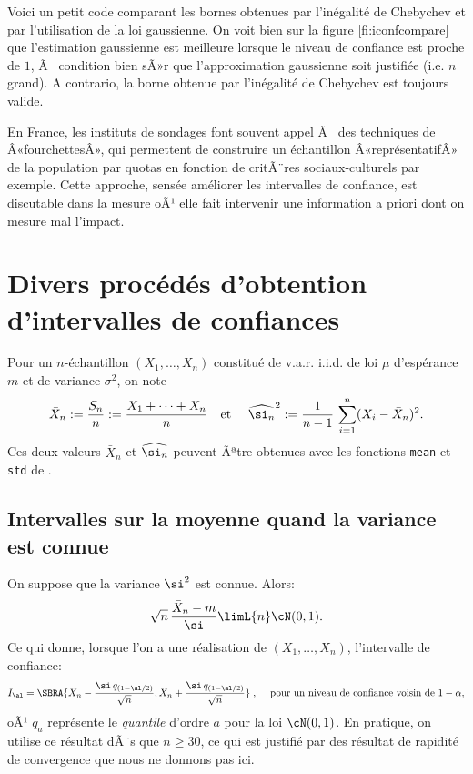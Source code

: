 Voici un petit code \ML{} comparant les bornes obtenues par l'inégalité de
Chebychev et par l'utilisation de la loi gaussienne. On voit bien sur la
figure \ref{fi:iconfcompare} que l'estimation gaussienne est meilleure
lorsque le niveau de confiance est proche de $1$, Ã  condition bien sÃ»r que
l'approximation gaussienne soit justifiée (i.e. $n$ grand). A contrario, la
borne obtenue par l'inégalité de Chebychev est toujours valide.

%
%
%

\begin{rem}
  En France, les instituts de sondages font souvent appel Ã  des techniques de
  Â«fourchettesÂ», qui permettent de construire un échantillon Â«représentatifÂ»
  de la population par quotas en fonction de critÃ¨res sociaux-culturels par
  exemple.  Cette approche, sensée améliorer les intervalles de confiance, est
  discutable dans la mesure oÃ¹ elle fait intervenir une information a priori
  dont on mesure mal l'impact.
\end{rem}

%
\section{Divers procédés d'obtention d'intervalles de confiances}
%

Pour un $n$-échantillon $(X_1,\ldots,X_n)$ constitué de v.a.r. i.i.d. de loi
$\mu$ d'espérance $m$ et de variance $\sigma^2$, on note
$$
\bar{X}_n := \frac{S_n}{n}:=\frac{X_1+\cdots+X_n}{n} 
\text{\quad et \quad}
\widehat{\si_n}^2:=\frac{1}{n-1}\,\sum_{i=1}^n (X_i-\bar{X}_n)^2.
$$
Ces deux valeurs $\bar{X}_n$ et $\widehat{\si_n}$ peuvent Ãªtre obtenues avec
les fonctions \texttt{mean} et \texttt{std} de \ML.

%
\subsection{Intervalles sur la moyenne quand la variance est connue} 
%

On suppose que la variance $\si^2$ est connue. Alors:
$$
\sqrt{n}\,\frac{\bar{X}_n -m}{\si} \limL{n} \cN(0,1).
$$
Ce qui donne, lorsque l'on a une réalisation de $(X_1,\ldots,X_n)$,
l'intervalle de confiance:
$$
I_\al=\SBRA{\bar{X}_n-\frac{\si \, q_{(1-\al/2)}}{\sqrt{n}},
  \bar{X}_n+\frac{\si \, q_{(1-\al/2)}}{\sqrt{n}}} \;,\;
\text{\quad pour un niveau de confiance voisin de $1-\alpha$},  
$$
oÃ¹ $q_a$ représente le \emph{quantile} d'ordre $a$ pour la loi $\cN(0,1)$.
En pratique, on utilise ce résultat dÃ¨s que $n \geq 30$, ce qui est justifié
par des résultat de rapidité de convergence que nous ne donnons pas ici.

